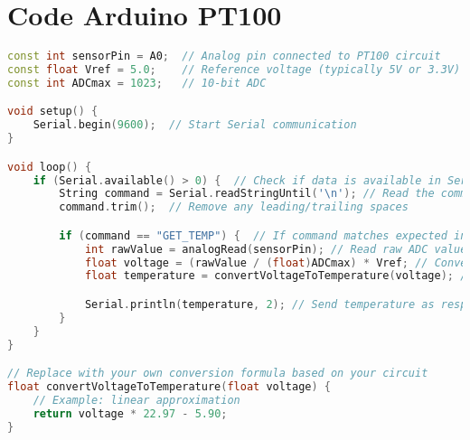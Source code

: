 \chapter{Code Arduino PT100}

\begin{lstlisting}[language=C++, caption={Arduino code for PT100 temperature sensor}]
const int sensorPin = A0;  // Analog pin connected to PT100 circuit
const float Vref = 5.0;    // Reference voltage (typically 5V or 3.3V)
const int ADCmax = 1023;   // 10-bit ADC

void setup() {
    Serial.begin(9600);  // Start Serial communication
}

void loop() {
    if (Serial.available() > 0) {  // Check if data is available in Serial
        String command = Serial.readStringUntil('\n'); // Read the command
        command.trim();  // Remove any leading/trailing spaces

        if (command == "GET_TEMP") {  // If command matches expected input
            int rawValue = analogRead(sensorPin); // Read raw ADC value
            float voltage = (rawValue / (float)ADCmax) * Vref; // Convert to voltage
            float temperature = convertVoltageToTemperature(voltage); // Convert to temperature

            Serial.println(temperature, 2); // Send temperature as response
        }
    }
}

// Replace with your own conversion formula based on your circuit
float convertVoltageToTemperature(float voltage) {
    // Example: linear approximation
    return voltage * 22.97 - 5.90;
}
\end{lstlisting}